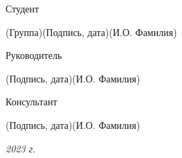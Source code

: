 \documentclass[14pt, russian]{scrartcl}
\begin{document}
\begin{titlepage}
	\vspace{\fill}


	\newlength{\ML}

	\noindent Студент \underline{} \hfill \underline{ \hspace{4cm}}\quad
	\underline{}

	\vspace{-2.1ex}
	\noindent\hspace{9ex}\scriptsize{(Группа)}\normalsize\hspace{170pt}\hspace{2ex}\scriptsize{(Подпись, дата)}\normalsize\hspace{30pt}\hspace{6ex}\scriptsize{(И.О. Фамилия)}\normalsize

	\bigskip

	\noindent Руководитель  \hfill \underline{\hspace{4cm}}\quad
	\underline{}

	\vspace{-2ex}
	\noindent\hspace{13.5ex}\normalsize\hspace{170pt}\hspace{2ex}\scriptsize{(Подпись, дата)}\normalsize\hspace{30pt}\hspace{6ex}\scriptsize{(И.О. Фамилия)}\normalsize

	\bigskip

	\noindent Консультант\hfill \underline{\hspace{4cm}}\quad
	\underline{\hspace{4cm}}

	\vspace{-2ex}
	\noindent\hspace{13.5ex}\normalsize\hspace{170pt}\hspace{2ex}\scriptsize{(Подпись, дата)}\normalsize\hspace{30pt}\hspace{6ex}\scriptsize{(И.О. Фамилия)}\normalsize
	\vfill




	\begin{center}
		\textsl{2023 г.}
	\end{center}
\end{titlepage}
\end{document}
